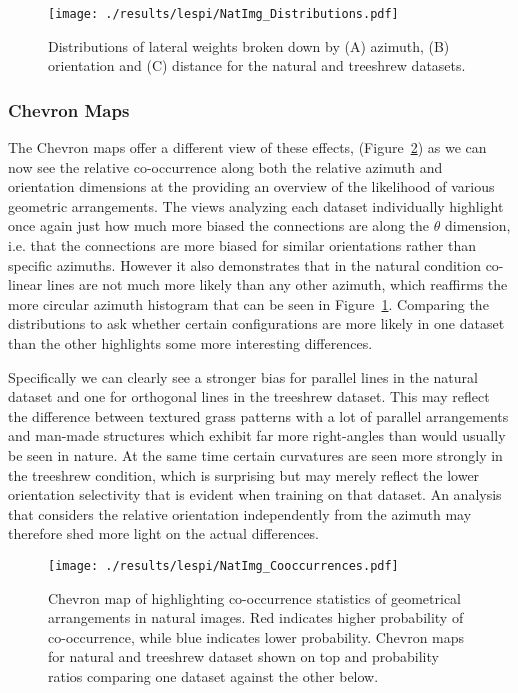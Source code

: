 \begin{figure}
	\centering
        \texttt{[image: ./results/lespi/NatImg\_Distributions.pdf]}
	\caption[Distributions of lateral weights broken down by azimuth,
      orientation and distance.]{Distributions of lateral weights
      broken down by (A) azimuth, (B) orientation and (C) distance for
      the natural and treeshrew datasets.}
	\label{NatImgDistributions}
\end{figure}

\subsubsection{Chevron Maps}

The Chevron maps offer a different view of these effects,
(Figure~\ref{NatImgCooccurrences}) as we can now see the relative
co-occurrence along both the relative azimuth and orientation
dimensions at the providing an overview of the likelihood of various
geometric arrangements. The views analyzing each dataset individually
highlight once again just how much more biased the connections are
along the $\theta$ dimension, i.e. that the connections are more
biased for similar orientations rather than specific azimuths. However
it also demonstrates that in the natural condition co-linear lines are
not much more likely than any other azimuth, which reaffirms the more
circular azimuth histogram that can be seen in
Figure~\ref{NatImgDistributions}. Comparing the distributions to ask
whether certain configurations are more likely in one dataset than the
other highlights some more interesting differences.

Specifically we can clearly see a stronger bias for parallel lines in
the natural dataset and one for orthogonal lines in the treeshrew
dataset. This may reflect the difference between textured grass
patterns with a lot of parallel arrangements and man-made structures
which exhibit far more right-angles than would usually be seen in
nature. At the same time certain curvatures are seen more strongly in
the treeshrew condition, which is surprising but may merely reflect
the lower orientation selectivity that is evident when training on
that dataset. An analysis that considers the relative orientation
independently from the azimuth may therefore shed more light on the
actual differences.

\begin{figure}
	\centering
        \texttt{[image: ./results/lespi/NatImg\_Cooccurrences.pdf]}
	\caption[Chevron map of highlighting co-occurrence statistics of
      geometrical arrangements in natural images.]{Chevron map of
      highlighting co-occurrence statistics of geometrical
      arrangements in natural images. Red indicates higher probability
      of co-occurrence, while blue indicates lower
      probability. Chevron maps for natural and treeshrew dataset
      shown on top and probability ratios comparing one dataset
      against the other below.}
	\label{NatImgCooccurrences}
\end{figure}

